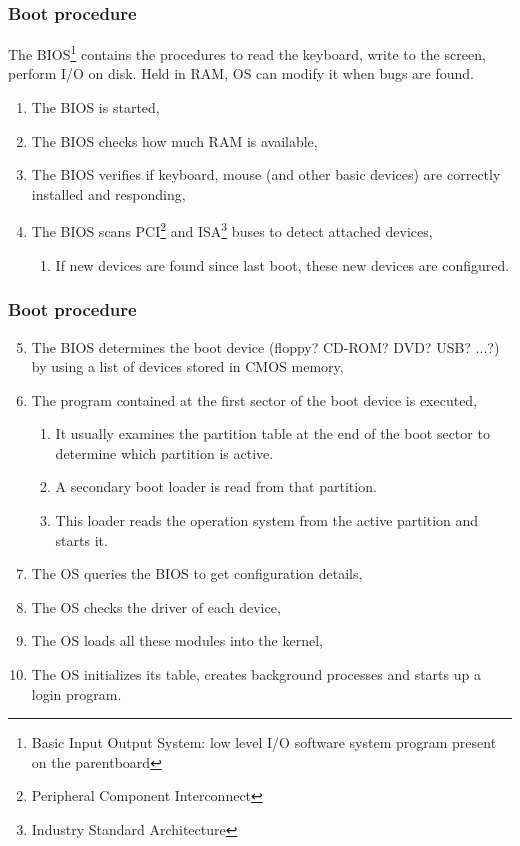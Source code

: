   \begin{frame}
    \frametitle{Boot procedure}
    The BIOS\footnote{Basic Input Output System: low level I/O software system program present on the parentboard} contains the procedures to read the keyboard, write to the screen, perform I/O on disk. Held in RAM, OS can modify it when bugs are found.
    \begin{enumerate}
      \item The BIOS is started,
      \item The BIOS checks how much RAM is available,
      \item The BIOS verifies if keyboard, mouse (and other basic devices) are correctly installed and responding,
      \item The BIOS scans PCI\footnote{Peripheral Component Interconnect} and ISA\footnote{Industry Standard Architecture} buses to detect attached devices,
        \begin{enumerate}
          \item If new devices are found since last boot, these new devices are configured.
        \end{enumerate}
    \end{enumerate}
  \end{frame}

  \begin{frame}
    \frametitle{Boot procedure}
    \begin{enumerate}
    \setcounter{enumi}{4}
      \item The BIOS determines the boot device (floppy? CD-ROM? DVD? USB? ...?) by using a list of devices stored in CMOS memory,
      \item The program contained at the first sector of the boot device is executed,
        \begin{enumerate}
          \item It usually examines the partition table at the end of the boot sector to determine which partition is active.
          \item A secondary boot loader is read from that partition.
          \item This loader reads the operation system from the active partition and starts it.
        \end{enumerate}
      \item The OS queries the BIOS to get configuration details,
      \item The OS checks the driver of each device,
      \item The OS loads all these modules into the kernel,
      \item The OS initializes its table, creates background processes and starts up a login program.
    \end{enumerate}
  \end{frame}

